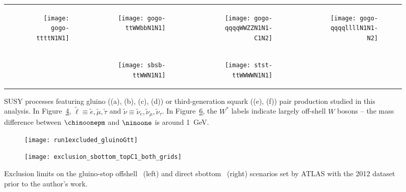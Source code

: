 \begin{figure}[t!]
\centering
\begin{tabular}{rrrr}
\begin{subfigure}[t]{0.24\textwidth}\texttt{[image: gogo-ttttN1N1]}\caption{}\label{fig:strategy.pheno.feynman_gtt}\end{subfigure}&
\begin{subfigure}[t]{0.24\textwidth}\texttt{[image: gogo-ttWWbbN1N1]}\caption{}\label{fig:strategy.pheno.feynman_gttOffshell}\end{subfigure}&
\begin{subfigure}[t]{0.24\textwidth}\texttt{[image: gogo-qqqqWWZZN1N1-C1N2]}\caption{}\label{fig:strategy.pheno.feynman_gg2WZ}\end{subfigure}&
\begin{subfigure}[t]{0.24\textwidth}\texttt{[image: gogo-qqqqllllN1N1-N2]}\caption{}\label{fig:strategy.pheno.feynman_gg2sl}\end{subfigure} \\
&
\begin{subfigure}[t]{0.24\textwidth}\texttt{[image: sbsb-ttWWN1N1]}\caption{}\label{fig:strategy.pheno.feynman_b1b1}\end{subfigure} &
\begin{subfigure}[t]{0.24\textwidth}\texttt{[image: stst-ttWWWWN1N1]}\caption{}\label{fig:strategy.pheno.feynman_t1t1}\end{subfigure} &
 \\
\end{tabular}
\caption{SUSY processes featuring gluino ((a), (b), (c), (d)) or third-generation squark ((e), (f)) pair production studied in this analysis. 
 In Figure~\ref{fig:strategy.pheno.feynman_gg2sl}, $\tilde{\ell} \equiv \tilde{e}, \tilde{\mu}, \tilde{\tau}$ and 
$\tilde{\nu} \equiv \tilde{\nu}_e, \tilde{\nu}_{\mu}, \tilde{\nu}_{\tau}$. In Figure~\ref{fig:strategy.pheno.feynman_t1t1}, the $W^*$ labels indicate 
largely off-shell $W$ bosons -- the mass difference between $\chinoonepm$ and $\ninoone$ is around 1~GeV.}
\label{fig:strategy.pheno.feynman}
\end{figure}


\begin{figure}[t]
\centering
\begin{subfigure}[t]{0.55\textwidth}\texttt{[image: run1excluded\_gluinoGtt]}\caption{}\label{fig:strategy.pheno.run1_gluinoGtt}\end{subfigure}
\begin{subfigure}[t]{0.38\textwidth}\texttt{[image: exclusion\_sbottom\_topC1\_both\_grids]}\caption{}\label{fig:strategy.pheno.sbottom_topC1}\end{subfigure}
\caption{Exclusion limits on the gluino-stop offshell~\cite{SUSY-2014-06} (left) and direct sbottom~\cite{SUSY-2014-07} (right) scenarios 
set by ATLAS with the 2012 dataset prior to the author's work.}
\label{fig:strategy.pheno.run1excl_3rdgen}
\end{figure}


